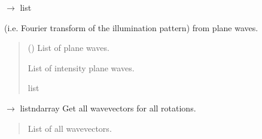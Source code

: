 \documentclass[letterpaper,10pt,english]{sphinxmanual}
\begin{document}
\begin{fulllineitems}
\begin{fulllineitems}
\begin{description}
\end{description}

\end{fulllineitems}


\begin{fulllineitems}
\label{\detokenize{source/Illumination:Illumination.Illumination.find_ipw_from_pw}}
\pysigstartsignatures
\pysiglinewithargsret
{}
{}
{{ $\rightarrow$ list\DUrole{p}{{[}}{\hyperref[\detokenize{source/Sources:Sources.IntensityPlaneWave}]{\sphinxcrossref{IntensityPlaneWave}}}\DUrole{p}{{]}}}}
\pysigstopsignatures\begin{description}
\sphinxAtStartPar
(i.e. Fourier transform of the illumination pattern) from plane waves.

\end{description}
\begin{quote}\begin{description}
\sphinxAtStartPar
{} () \textendash{} List of plane waves.

\sphinxAtStartPar
List of intensity plane waves.

\sphinxAtStartPar
list

\end{description}\end{quote}

\end{fulllineitems}


\begin{fulllineitems}
\label{\detokenize{source/Illumination:Illumination.Illumination.get_all_wavevectors}}
\pysigstartsignatures
\pysiglinewithargsret
{}
{}
{{ $\rightarrow$ list\DUrole{p}{{[}}ndarray\DUrole{p}{{]}}}}
\pysigstopsignatures
\sphinxAtStartPar
Get all wavevectors for all rotations.
\begin{quote}\begin{description}
\sphinxAtStartPar
List of all wavevectors.


\end{description}
\end{quote}
\end{fulllineitems}
\end{fulllineitems}
\end{document}
